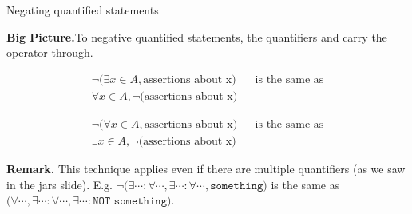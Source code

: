 \documentclass[10pt]{beamer}
\begin{document}
\begin{frame}{}
\vfill 


\vfill 


\vfill 
{}
\end{frame}

\begin{frame}{Negating quantified statements}
\footnotesize 

\colorbox{green!30}{\textbf{Big Picture.}}To negative quantified statements,  the quantifiers and carry the  operator through.

 
\vfill 

\begin{mygreenbox}[title=Negating \textbf{Existential} Statements]
\begin{align*}
\lnot \bigg( \exists x \in A, \text{assertions about x}\bigg) &&\text{is the same as} \\
\forall x \in A, \lnot \bigg( \text{assertions about x}\bigg)	
\end{align*}	
\end{mygreenbox}
\pause 
\vfill 
\begin{mygreenbox}[title=Negating \textbf{Universal} Statements]
\begin{align*}
\lnot \bigg( \forall x \in A, \text{assertions about x}\bigg) &&\text{is the same as} \\
\exists x \in A, \lnot \bigg( \text{assertions about x}\bigg)	
\end{align*}	
\end{mygreenbox}
\pause 
\vfill 
\colorbox{red!30}{\textbf{Remark.}} This technique applies even if there are multiple quantifiers (as we saw in the jars slide).  \pause E.g. $\lnot \bigg( \exists \cdots : \forall \cdots,  \exists \cdots : \forall \cdots, \texttt{something} \bigg)$ is the same as  $\bigg( \forall \cdots , \exists \cdots  : \forall \cdots , \exists \cdots : \texttt{NOT something} \bigg)$.
\end{frame}
\end{document}

